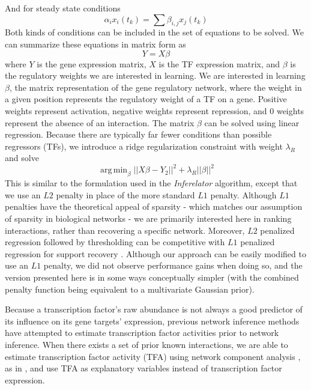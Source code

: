 \documentclass[11pt]{article}
\DeclareMathOperator*{\argmin}{arg\,min}
\begin{document}
And for steady state conditions
\begin{equation}
\alpha_{i}x_{i}(t_k) = \sum \beta_{i,j}x_{j}(t_k)
\end{equation}
Both kinds of conditions can be included in the set of equations to be solved. We can summarize these equations in matrix form as
\begin{equation}
Y = X \beta 
\end{equation}
where $Y$ is the gene expression matrix, $X$ is the TF expression matrix, and $\beta$ is the regulatory weights we are interested in learning.
We are interested in learning $\beta$, the matrix representation of the gene regulatory network, where the weight in a given position represents the regulatory weight of a TF on a gene. 
Positive weights represent activation, negative weights represent repression, and 0 weights represent the absence of an interaction. The matrix $\beta$ can be solved using linear regression. 
Because there are typically far fewer conditions than possible regressors (TFs), we introduce a ridge regularization constraint with weight $\lambda_R$ and solve
\begin{equation}
\argmin_\beta\vert \vert X\beta - Y_2 \vert \vert ^2 + \lambda_R \vert \vert \beta \vert \vert ^2
\end{equation}
This is similar to the formulation used in the \textit{Inferelator} algorithm, except that we use an $L2$ penalty in place of the more standard $L1$ penalty. Although $L1$ penalties have the theoretical appeal of sparsity - which matches our assumption of sparsity in biological networks - we are primarily interested here in ranking interactions, rather than recovering a specific network. Moreover, $L2$ penalized regression followed by thresholding can be competitive with $L1$ penalized regression for support recovery \cite{shao_estimation_2012}. Although our approach can be easily modified to use an $L1$ penalty, we did not observe performance gains when doing so, and the version presented here is in some ways conceptually simpler (with the combined penalty function being equivalent to a multivariate Gaussian prior). 

Because a transcription factor's raw abundance is not always a good predictor of its influence on its gene targets' expression, previous network inference methods have attempted to estimate transcription factor activities prior to network inference. When there exists a set of prior known interactions, we are able to estimate transcription factor activity (TFA) using network component analysis \cite{liao2003network}, as in \cite{arrieta-ortiz_experimentally_2015, fu_reconstructing_2011}, and use TFA as explanatory variables instead of transcription factor expression. 
\end{document}

